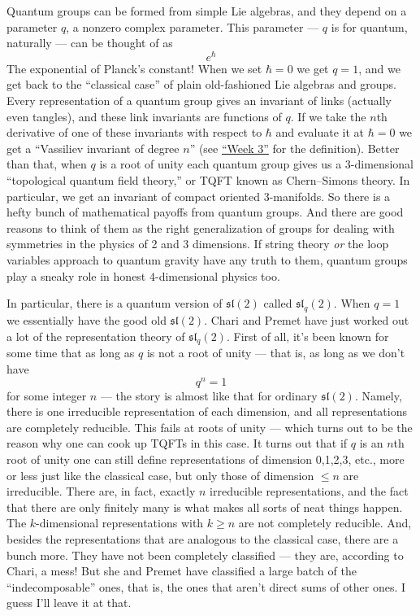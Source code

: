\documentclass{article}
\begin{document}
Quantum groups can be formed from simple Lie algebras, and they depend
on a parameter \(q\), a nonzero complex parameter. This parameter ---
\(q\) is for quantum, naturally --- can be thought of as \[e^\hbar\] The
exponential of Planck's constant! When we set \(\hbar = 0\) we get
\(q = 1\), and we get back to the ``classical case'' of plain
old-fashioned Lie algebras and groups. Every representation of a quantum
group gives an invariant of links (actually even tangles), and these
link invariants are functions of \(q\). If we take the \(n\)th
derivative of one of these invariants with respect to \(\hbar\) and
evaluate it at \(\hbar = 0\) we get a ``Vassiliev invariant of degree
\(n\)'' (see \protect\hyperlink{week3}{``Week 3''} for the definition).
Better than that, when \(q\) is a root of unity each quantum group gives
us a \(3\)-dimensional ``topological quantum field theory,'' or TQFT
known as Chern--Simons theory. In particular, we get an invariant of
compact oriented 3-manifolds. So there is a hefty bunch of mathematical
payoffs from quantum groups. And there are good reasons to think of them
as the right generalization of groups for dealing with symmetries in the
physics of 2 and 3 dimensions. If string theory \emph{or} the loop
variables approach to quantum gravity have any truth to them, quantum
groups play a sneaky role in honest \(4\)-dimensional physics too.

In particular, there is a quantum version of \(\mathfrak{sl}(2)\) called
\(\mathfrak{sl}_q(2)\). When \(q = 1\) we essentially have the good old
\(\mathfrak{sl}(2)\). Chari and Premet have just worked out a lot of the
representation theory of \(\mathfrak{sl}_q(2)\). First of all, it's been
known for some time that as long as \(q\) is not a root of unity ---
that is, as long as we don't have \[q^n = 1\] for some integer \(n\) ---
the story is almost like that for ordinary \(\mathfrak{sl}(2)\). Namely,
there is one irreducible representation of each dimension, and all
representations are completely reducible. This fails at roots of unity
--- which turns out to be the reason why one can cook up TQFTs in this
case. It turns out that if \(q\) is an \(n\)th root of unity one can
still define representations of dimension 0,1,2,3, etc., more or less
just like the classical case, but only those of dimension
\(\leqslant n\) are irreducible. There are, in fact, exactly \(n\)
irreducible representations, and the fact that there are only finitely
many is what makes all sorts of neat things happen. The
\(k\)-dimensional representations with \(k \geqslant n\) are not
completely reducible. And, besides the representations that are
analogous to the classical case, there are a bunch more. They have not
been completely classified --- they are, according to Chari, a mess! But
she and Premet have classified a large batch of the ``indecomposable''
ones, that is, the ones that aren't direct sums of other ones. I guess
I'll leave it at that.
\end{document}
